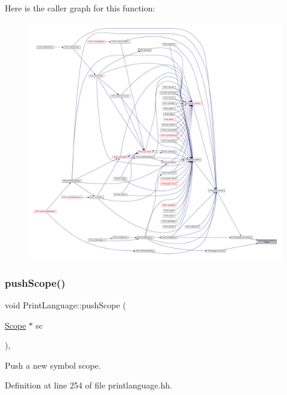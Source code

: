 Here is the caller graph for this function\+:
\nopagebreak
\begin{figure}[H]
\begin{center}
\leavevmode
\includegraphics[width=350pt]{class_print_language_a918310a27fdef5cde48b3fe6e4c7999f_icgraph}
\end{center}
\end{figure}
\mbox{\label{class_print_language_a5269a74d663ef92b7d7f484ea02b085d}} 
\subsubsection{\texorpdfstring{pushScope()}{pushScope()}}
{\footnotesize\ttfamily void Print\+Language\+::push\+Scope (\begin{DoxyParamCaption}\item[{\mbox{\hyperlink{class_scope}{Scope}} $\ast$}]{sc }\end{DoxyParamCaption})\hspace{0.3cm}{\ttfamily [inline]}, {\ttfamily [protected]}}



Push a new symbol scope. 



Definition at line 254 of file printlanguage.\+hh.

\mbox{\label{class_print_language_a481c41c176f1b5edea4e984997243f43}} 
